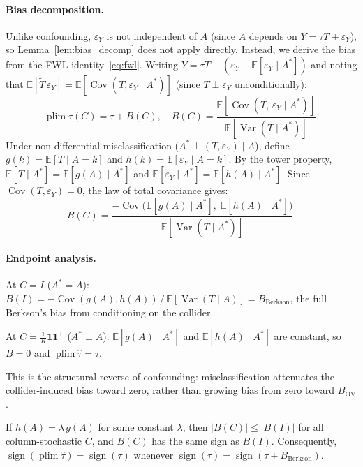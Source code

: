 \paragraph{Bias decomposition.}
Unlike confounding, $\varepsilon_Y$ is not independent of $A$ (since $A$ depends on $Y=\tau T+\varepsilon_Y$), so Lemma~\ref{lem:bias_decomp} does not apply directly.
Instead, we derive the bias from the FWL identity~\eqref{eq:fwl}.
Writing $\tilde{Y}=\tau\tilde{T}+(\varepsilon_Y-\mathbb{E}[\varepsilon_Y\mid A^*])$ and noting that $\mathbb{E}[\tilde{T}\,\varepsilon_Y]=\mathbb{E}[\operatorname{Cov}(T,\varepsilon_Y\mid A^*)]$ (since $T\perp\varepsilon_Y$ unconditionally):
\begin{equation}
  \operatorname{plim}\hat\tau(C) = \tau + B(C),\quad
  B(C) = \frac{\mathbb{E}[\operatorname{Cov}(T,\,\varepsilon_Y\mid A^*)]}{\mathbb{E}[\operatorname{Var}(T\mid A^*)]}.
  \label{eq:bias_col}
\end{equation}
Under non-differential misclassification ($A^*\perp(T,\varepsilon_Y)\mid A$), define $g(k)=\mathbb{E}[T\mid A{=}k]$ and $h(k)=\mathbb{E}[\varepsilon_Y\mid A{=}k]$.
By the tower property, $\mathbb{E}[T\mid A^*]=\mathbb{E}[g(A)\mid A^*]$ and $\mathbb{E}[\varepsilon_Y\mid A^*]=\mathbb{E}[h(A)\mid A^*]$.
Since $\operatorname{Cov}(T,\varepsilon_Y)=0$, the law of total covariance gives:
\[
  B(C) = \frac{-\operatorname{Cov}\bigl(\mathbb{E}[g(A)\mid A^*],\;\mathbb{E}[h(A)\mid A^*]\bigr)}{\mathbb{E}[\operatorname{Var}(T\mid A^*)]}.
\]

\paragraph{Endpoint analysis.}
At $C=I$ ($A^*{=}A$):
$B(I) = -\operatorname{Cov}(g(A),h(A))\,/\,\mathbb{E}[\operatorname{Var}(T\mid A)] = B_{\mathrm{Berkson}}$,
the full Berkson's bias from conditioning on the collider.

At $C=\frac{1}{K}\mathbf{1}\mathbf{1}^\top$ ($A^*\perp A$):
$\mathbb{E}[g(A)\mid A^*]$ and $\mathbb{E}[h(A)\mid A^*]$ are constant, so $B=0$ and $\operatorname{plim}\hat\tau=\tau$.

This is the structural reverse of confounding: misclassification attenuates the collider-induced bias toward zero, rather than growing bias from zero toward $B_{\mathrm{OV}}$.

\begin{proposition}
\label{prop:col_prop}
If $h(A)=\lambda\,g(A)$ for some constant $\lambda$, then $|B(C)|\leq|B(I)|$ for all column-stochastic $C$, and $B(C)$ has the same sign as $B(I)$.
Consequently, $\operatorname{sign}(\operatorname{plim}\hat\tau)=\operatorname{sign}(\tau)$ whenever $\operatorname{sign}(\tau)=\operatorname{sign}(\tau+B_{\mathrm{Berkson}})$.
\end{proposition}

